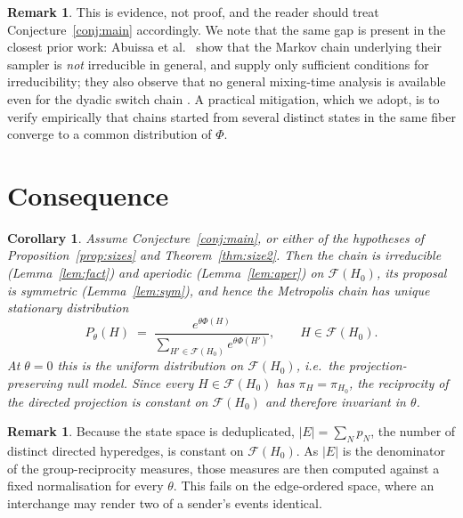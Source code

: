 \documentclass[11pt]{article}
\newtheorem{corollary}[theorem]{Corollary}
\theoremstyle{definition}
\newtheorem{remark}[theorem]{Remark}
\newcommand{\Fcal}{\mathcal{F}}
\begin{document}
\begin{remark}
This is evidence, not proof, and the reader should treat
Conjecture~\ref{conj:main} accordingly. We note that the same gap is present in
the closest prior work: Abuissa et al.~\cite{dinghy} show that the Markov chain
underlying their sampler is \emph{not} irreducible in general, and supply only
sufficient conditions for irreducibility; they also observe that no general
mixing-time analysis is available even for the dyadic switch chain
\cite{erdos2022}. A practical mitigation, which we adopt, is to verify
empirically that chains started from several distinct states in the same fiber
converge to a common distribution of $\Phi$.
\end{remark}

\section{Consequence}

\begin{corollary}
Assume Conjecture~\ref{conj:main}, or either of the hypotheses of
Proposition~\ref{prop:sizes} and Theorem~\ref{thm:size2}. Then the chain is
irreducible (Lemma~\ref{lem:fact}) and aperiodic (Lemma~\ref{lem:aper}) on
$\Fcal(H_0)$, its proposal is symmetric (Lemma~\ref{lem:sym}), and hence the
Metropolis chain has unique stationary distribution
\[
  P_\theta(H)\;=\;\frac{e^{\theta\Phi(H)}}{\sum_{H'\in\Fcal(H_0)}e^{\theta\Phi(H')}},
  \qquad H\in\Fcal(H_0).
\]
At $\theta=0$ this is the uniform distribution on $\Fcal(H_0)$, i.e.\ the
projection-preserving null model. Since every $H\in\Fcal(H_0)$ has
$\pi_H=\pi_{H_0}$, the reciprocity of the directed projection is constant on
$\Fcal(H_0)$ and therefore invariant in $\theta$.
\end{corollary}

\begin{remark}
Because the state space is deduplicated, $|E|=\sum_N p_N$, the number of
distinct directed hyperedges, is constant on $\Fcal(H_0)$. As $|E|$ is the
denominator of the group-reciprocity measures, those measures are then computed
against a fixed normalisation for every $\theta$. This fails on the
edge-ordered space, where an interchange may render two of a sender's events
identical.
\end{remark}
\end{document}
